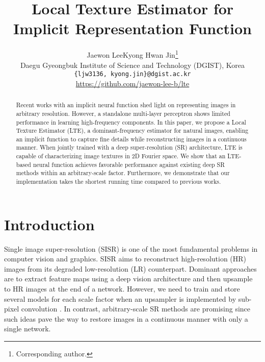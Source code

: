 \documentclass[10pt,twocolumn,letterpaper]{article}
\begin{document}
\title{Local Texture Estimator for Implicit Representation Function}

\author{
Jaewon Lee\qquad Kyong Hwan Jin\thanks{Corresponding author.}\\
Daegu Gyeongbuk Institute of Science and Technology (DGIST), Korea\\
{\tt\small \{ljw3136, kyong.jin\}@dgist.ac.kr}\\
\url{https://github.com/jaewon-lee-b/lte}
}
\maketitle

\begin{abstract}
Recent works with an implicit neural function shed light on representing images in arbitrary resolution. However, a standalone multi-layer perceptron shows limited performance in learning high-frequency components. In this paper, we propose a Local Texture Estimator (LTE), a dominant-frequency estimator for natural images, enabling an implicit function to capture fine details while reconstructing images in a continuous manner. When jointly trained with a deep super-resolution (SR) architecture, LTE is capable of characterizing image textures in 2D Fourier space.
We show that an LTE-based neural function achieves favorable performance against existing deep SR methods within an arbitrary-scale factor.
Furthermore, we demonstrate that our implementation takes the shortest running time compared to previous works.
\end{abstract}
\vspace{-10pt}

\section{Introduction}
Single image super-resolution (SISR) is one of the most fundamental problems in computer vision and graphics. SISR aims to reconstruct high-resolution (HR) images from its degraded low-resolution (LR) counterpart. Dominant approaches \cite{DBLP:journals/corr/ShiCHTABRW16,Lim_2017_CVPR_Workshops, zhang2018rcan, zhang2018residual, dai2019second, Mei_2021_CVPR, DBLP:conf/cvpr/Chen000DLMX0021, liang2021swinir} are to extract feature maps using a deep vision architecture and then upsample to HR images at the end of a network. However, we need to train and store several models for each scale factor when an upsampler is implemented by sub-pixel convolution \cite{DBLP:journals/corr/ShiCHTABRW16}. In contrast, arbitrary-scale SR methods \cite{hu2019meta, chen2021learning} are promising since such ideas pave the way to restore images in a continuous manner with only a single network. 
\end{document}
